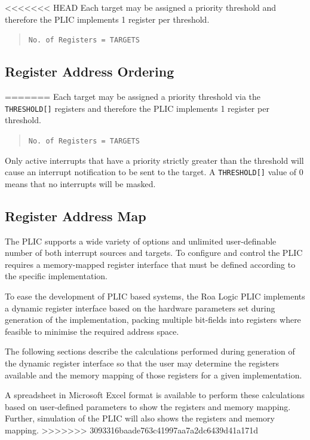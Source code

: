 <<<<<<< HEAD
Each target may be assigned a priority threshold and therefore the PLIC implements 1 register per threshold.

\begin{quote}
\texttt{No.\ of\ Registers\ =\ TARGETS}
\end{quote}

\subsection{Register Address Ordering}

=======
Each target may be assigned a priority threshold via the
\texttt{THRESHOLD[]} registers and therefore the PLIC
implements 1 register per threshold. 

\begin{quote}
	\texttt{No.\ of\ Registers\ =\ TARGETS}
\end{quote}

Only active interrupts that have a priority strictly greater than the
threshold will cause an interrupt notification to be sent to the target.
A \texttt{THRESHOLD[]} value of 0 means that no interrupts will be masked.

\subsection{Register Address Map}

The PLIC supports a wide variety of options and unlimited user-definable
number of both interrupt sources and targets. To configure and control
the PLIC requires a memory-mapped register interface that must be
defined according to the specific implementation.

To ease the development of PLIC based systems, the Roa Logic PLIC
implements a dynamic register interface based on the hardware parameters
set during generation of the implementation, packing multiple bit-fields
into registers where feasible to minimise the required address space.

The following sections describe the calculations performed during
generation of the dynamic register interface so that the user may
determine the registers available and the memory mapping of those
registers for a given implementation.

A spreadsheet in Microsoft Excel format is available to perform these
calculations based on user-defined parameters to show the registers and
memory mapping. Further, simulation of the PLIC will also shows the
registers and memory mapping.
>>>>>>> 3093316baade763c41997aa7a2dc6439d41a171d

